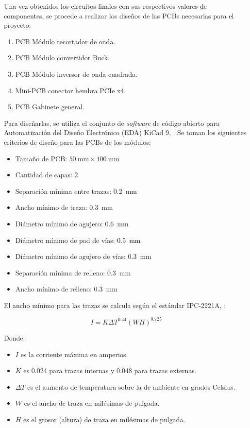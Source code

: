 Una vez obtenidos los circuitos finales con sus respectivos valores de componentes, se procede a realizar los diseños de las PCBs necesarias para el proyecto:

\begin{enumerate}[noitemsep]
    \item PCB Módulo recortador de onda.
    \item PCB Módulo convertidor Buck.
    \item PCB Módulo inversor de onda cuadrada.
    \item Mini-PCB conector hembra PCIe x4.
    \item PCB Gabinete general.
\end{enumerate}

Para diseñarlas, se utiliza el conjunto de \textit{software} de código abierto para Automatización del Diseño Electrónico (EDA) KiCad 9, \parencite{KiCad}. Se toman los siguientes criterios de diseño para las PCBs de los módulos:

\begin{itemize}[noitemsep]
    \item Tamaño de PCB: $\SI{50}{\milli\meter} \times \SI{100}{\milli\meter}$
    \item Cantidad de capas: 2
    \item Separación mínima entre trazas: \SI{0.2}{\milli\meter}
    \item Ancho mínimo de traza: \SI{0.3}{\milli\meter}
    \item Diámetro mínimo de agujero: \SI{0.6}{\milli\meter}
    \item Diámetro mínimo de pad de vías: \SI{0.5}{\milli\meter}
    \item Diámetro mínimo de agujero de vías: \SI{0.3}{\milli\meter}
    \item Separación mínima de relleno: \SI{0.3}{\milli\meter}
    \item Ancho mínimo de relleno: \SI{0.3}{\milli\meter}
\end{itemize}

El ancho mínimo para las trazas se calcula según el estándar IPC-2221A, \parencite{IPC-2221A}:

\begin{equation}
    I = K {\Delta T}^{0.44} {(W H)}^{0.725}
    \label{eq:pcb:corriente_traza}
\end{equation}

Donde:

\begin{itemize}[noitemsep]
    \item $I$ es la corriente máxima en amperios.
    \item $K$ es 0.024 para trazas internas y 0.048 para trazas externas.
    \item $\Delta T$ es el aumento de temperatura sobre la de ambiente en grados Celsius.
    \item $W$ es el ancho de traza en milésimas de pulgada.
    \item $H$ es el grosor (altura) de traza en milésimas de pulgada.
\end{itemize}

